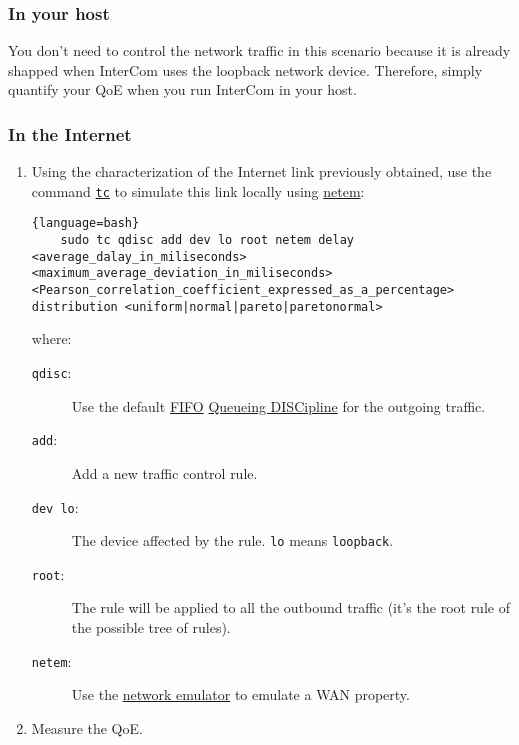 \subsubsection{In your host}

You don't need to control the network traffic in this scenario because
it is already shapped when InterCom uses the loopback network
device. Therefore, simply quantify your QoE when you run InterCom in
your host.

\subsubsection{In the Internet}

\begin{enumerate}
  
\item Using the characterization of the Internet link previously
  obtained, use the command
  \href{https://man7.org/linux/man-pages/man8/tc.8.html}{\texttt{tc}}
  to simulate this link locally using
  \href{https://man7.org/linux/man-pages/man8/tc-netem.8.html}{netem}:

  \begin{lstlisting}{language=bash}
    sudo tc qdisc add dev lo root netem delay <average_dalay_in_miliseconds> <maximum_average_deviation_in_miliseconds> <Pearson_correlation_coefficient_expressed_as_a_percentage> distribution <uniform|normal|pareto|paretonormal>
  \end{lstlisting}
  where:
  \begin{description}
  \item [\texttt{qdisc}:] Use the default
    \href{https://en.wikipedia.org/wiki/FIFO_(computing_and_electronics)}{FIFO}
    \href{https://wiki.debian.org/TrafficControl}{Queueing DISCipline}
    for the outgoing traffic.
  \item [\texttt{add}:] Add a new traffic control rule.
  \item [\texttt{dev lo}:] The device affected by the
    rule. \texttt{lo} means \texttt{loopback}.
  \item [\texttt{root}:] The rule will be applied to all the outbound
    traffic (it's the root rule of the possible tree of rules).
  \item [\texttt{netem}:] Use the
    \href{https://wiki.linuxfoundation.org/networking/netem}{network
      emulator} to emulate a WAN property.
  \end{description}

\item Measure the QoE.


\end{enumerate}
